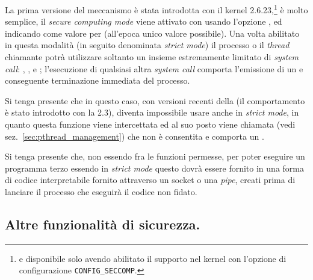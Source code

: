 La prima versione del meccanismo è stata introdotta con il kernel
2.6.23,\footnote{e disponibile solo avendo abilitato il supporto nel kernel
  con l'opzione di configurazione \texttt{CONFIG\_SECCOMP}.} è molto semplice,
il \textit{secure computing mode} viene attivato con  usando
l'opzione , ed indicando 
come valore per  (all'epoca unico valore possibile).  Una volta
abilitato in questa modalità (in seguito denominata \textit{strict mode}) il
processo o il \textit{thread} chiamante potrà utilizzare soltanto un insieme
estremamente limitato di \textit{system call}: , ,
 e ; l'esecuzione di qualsiasi altra
\textit{system call} comporta l'emissione di un  e conseguente
terminazione immediata del processo.

Si tenga presente che in questo caso, con versioni recenti della 
(il comportamento è stato introdotto con la 2.3), diventa impossibile usare
anche  in \textit{strict mode}, in quanto questa funzione viene
intercettata ed al suo posto viene chiamata  (vedi
sez.~\ref{sec:pthread_management}) che non è consentita e comporta un
.

Si tenga presente che, non essendo  fra le funzioni permesse, per
poter eseguire un programma terzo essendo in \textit{strict mode} questo dovrà
essere fornito in una forma di codice interpretabile fornito attraverso un
socket o una \textit{pipe}, creati prima di lanciare il processo che eseguirà
il codice non fidato. 







\subsection{Altre funzionalità di sicurezza.}
\label{sec:procadv_security_misc}


